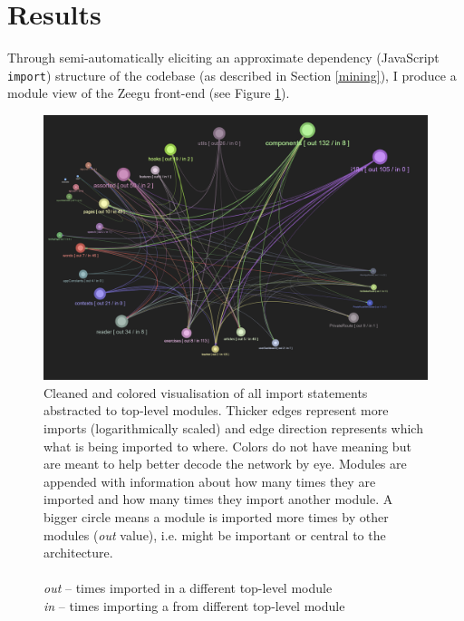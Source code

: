 \documentclass{article}
\begin{document}
\section{Results}



Through semi-automatically eliciting an approximate dependency (JavaScript \verb|import|) structure of the codebase
(as described in Section \ref{mining}),
I produce a module view of the Zeegu front-end (see Figure \ref{fig:3:clean}).

\begin{figure}[h]
  \centering 
  \includegraphics[width=\textwidth]{graphics/module_abstraction_cleaned.png}
  \caption{Cleaned and colored visualisation of all import statements abstracted to top-level modules. 
  Thicker edges represent more imports (logarithmically scaled) and edge 
  direction represents which what is being imported to where.
  Colors do not have meaning but are meant to help better decode the network by eye.
  Modules are appended with information about how many times they are imported and how many times they import another module.
  A bigger circle means a module is imported more times by other modules (\textit{out} value),
  i.e. might be important or central to the architecture. \\ \vspace*{.25em} \\
  \hspace*{2em}\textit{out} -- times imported in a different top-level module \\
  \hspace*{2em}\textit{in} -- times importing a from different top-level module}
  \label{fig:3:clean}
\end{figure}
\end{document}
